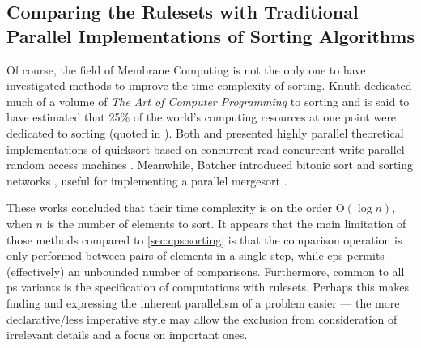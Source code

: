 
\subsection{Comparing the  Rulesets with Traditional Parallel Implementations of Sorting Algorithms}

Of course, the field of Membrane Computing is not the only one to have investigated methods to improve the time complexity of sorting.  Knuth dedicated much of a volume of \textit{The Art of Computer Programming} to sorting \cite{Knuth1998} and is said to have estimated that 25\% of the world's computing resources at one point were dedicated to sorting (quoted in \cite{Powers1991}).  Both \citeauthor{Powers1991} \cite{Powers1991} and \citeauthor{Chlebus1991} \cite{Chlebus1991} presented highly parallel theoretical implementations of quicksort based on concurrent-read concurrent-write parallel random access machines \cite{JaJa2011}.  Meanwhile, Batcher introduced bitonic sort and sorting networks \cite{Akl2011}, useful for implementing a parallel mergesort \cite{Lee1995}.

These works concluded that their time complexity is on the order O\((\log n)\), when \(n\) is the number of elements to sort.  It appears that the main limitation of those methods compared to \cref{sec:cps:sorting} is that the comparison operation is only performed between pairs of elements in a single step, while \gls{cps} permits (effectively) an unbounded number of comparisons.  Furthermore, common to all \gls{ps} variants is the specification of computations with rulesets.  Perhaps this makes finding and expressing the inherent parallelism of a problem easier --- the more declarative/less imperative style may allow the exclusion from consideration of irrelevant details and a focus on important ones.